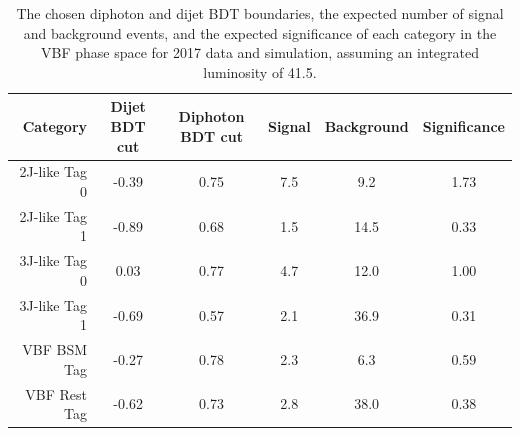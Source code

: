 \begin{table}
  \begin{centering}
    \begin{tabular}{ r | c | c | c | c | c } 
    \hline 
    Category       & Dijet BDT cut & Diphoton BDT cut & Signal & Background & Significance \\ 
    \hline 
    2J-like  Tag 0 & -0.39        & 0.75            & 7.5    & 9.2        & 1.73         \\
    2J-like  Tag 1 & -0.89        & 0.68            & 1.5    & 14.5       & 0.33         \\
    3J-like  Tag 0 & 0.03         & 0.77            & 4.7    & 12.0       & 1.00         \\
    3J-like  Tag 1 & -0.69        & 0.57            & 2.1    & 36.9       & 0.31         \\
    VBF BSM Tag    & -0.27        & 0.78            & 2.3    & 6.3        & 0.59         \\
    VBF Rest Tag   & -0.62        & 0.73            & 2.8    & 38.0       & 0.38         \\
    \hline 
    \end{tabular}
    \caption{The chosen diphoton and dijet BDT boundaries, 
    the expected number of signal and background events, 
    and the expected significance of each category in the VBF phase space 
    for 2017 data and simulation, assuming an integrated luminosity of \SI{41.5}{\fbinv}.}
    \label{tab:cat_VBFcuts2017}
  \end{centering}
\end{table}
